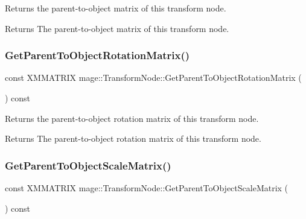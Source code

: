 Returns the parent-\/to-\/object matrix of this transform node.

\begin{DoxyReturn}{Returns}
The parent-\/to-\/object matrix of this transform node. 
\end{DoxyReturn}
\hypertarget{structmage_1_1_transform_node_a6a5c82910f5f6395a74bddf3d564547c}{}\label{structmage_1_1_transform_node_a6a5c82910f5f6395a74bddf3d564547c} 
\subsubsection{\texorpdfstring{Get\+Parent\+To\+Object\+Rotation\+Matrix()}{GetParentToObjectRotationMatrix()}}
{\footnotesize\ttfamily const X\+M\+M\+A\+T\+R\+IX mage\+::\+Transform\+Node\+::\+Get\+Parent\+To\+Object\+Rotation\+Matrix (\begin{DoxyParamCaption}{ }\end{DoxyParamCaption}) const\hspace{0.3cm}{\ttfamily [noexcept]}}

Returns the parent-\/to-\/object rotation matrix of this transform node.

\begin{DoxyReturn}{Returns}
The parent-\/to-\/object rotation matrix of this transform node. 
\end{DoxyReturn}
\hypertarget{structmage_1_1_transform_node_adad8b644fdd549028bb86f97606e2798}{}\label{structmage_1_1_transform_node_adad8b644fdd549028bb86f97606e2798} 
\subsubsection{\texorpdfstring{Get\+Parent\+To\+Object\+Scale\+Matrix()}{GetParentToObjectScaleMatrix()}}
{\footnotesize\ttfamily const X\+M\+M\+A\+T\+R\+IX mage\+::\+Transform\+Node\+::\+Get\+Parent\+To\+Object\+Scale\+Matrix (\begin{DoxyParamCaption}{ }\end{DoxyParamCaption}) const\hspace{0.3cm}{\ttfamily [noexcept]}}

